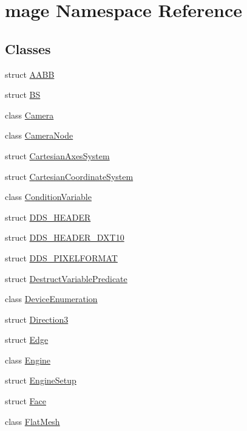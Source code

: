 \hypertarget{namespacemage}{}\section{mage Namespace Reference}
\label{namespacemage}
\subsection*{Classes}
\begin{DoxyCompactItemize}
\item 
struct \hyperlink{structmage_1_1_a_a_b_b}{A\+A\+BB}
\item 
struct \hyperlink{structmage_1_1_b_s}{BS}
\item 
class \hyperlink{classmage_1_1_camera}{Camera}
\item 
class \hyperlink{classmage_1_1_camera_node}{Camera\+Node}
\item 
struct \hyperlink{structmage_1_1_cartesian_axes_system}{Cartesian\+Axes\+System}
\item 
struct \hyperlink{structmage_1_1_cartesian_coordinate_system}{Cartesian\+Coordinate\+System}
\item 
class \hyperlink{classmage_1_1_condition_variable}{Condition\+Variable}
\item 
struct \hyperlink{structmage_1_1_d_d_s___h_e_a_d_e_r}{D\+D\+S\+\_\+\+H\+E\+A\+D\+ER}
\item 
struct \hyperlink{structmage_1_1_d_d_s___h_e_a_d_e_r___d_x_t10}{D\+D\+S\+\_\+\+H\+E\+A\+D\+E\+R\+\_\+\+D\+X\+T10}
\item 
struct \hyperlink{structmage_1_1_d_d_s___p_i_x_e_l_f_o_r_m_a_t}{D\+D\+S\+\_\+\+P\+I\+X\+E\+L\+F\+O\+R\+M\+AT}
\item 
struct \hyperlink{structmage_1_1_destruct_variable_predicate}{Destruct\+Variable\+Predicate}
\item 
class \hyperlink{classmage_1_1_device_enumeration}{Device\+Enumeration}
\item 
struct \hyperlink{structmage_1_1_direction3}{Direction3}
\item 
struct \hyperlink{structmage_1_1_edge}{Edge}
\item 
class \hyperlink{classmage_1_1_engine}{Engine}
\item 
struct \hyperlink{structmage_1_1_engine_setup}{Engine\+Setup}
\item 
struct \hyperlink{structmage_1_1_face}{Face}
\item 
class \hyperlink{classmage_1_1_flat_mesh}{Flat\+Mesh}
\item 

\end{DoxyCompactItemize}
